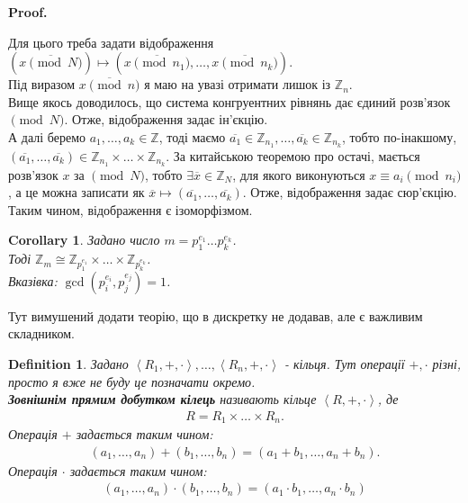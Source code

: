 \documentclass[a4paper, 14pt]{extarticle}
\makeatletter
\theoremstyle{theoremdd}
\theoremstyle{theoremdd}
\newtheorem{definition}[theorem]{Definition}
\theoremstyle{theoremdd}
\theoremstyle{theoremdd}
\theoremstyle{theoremdd}
\theoremstyle{theoremdd}
\theoremstyle{theoremdd}
\theoremstyle{theoremdd}
\newtheorem{corollary}[theorem]{Corollary}
\def\qed{$\blacksquare$}
\renewenvironment{proof}[1][Proof.\\]{\par
\pushQED{\hfill \qed}%
\normalfont \topsep6\p@\@plus6\p@\relax
\trivlist
\item\relax
{\bfseries
#1\@addpunct{.}}\hspace\labelsep\ignorespaces
}{%
\popQED\endtrivlist\@endpefalse
}
\makeatother
\begin{document}
\begin{proof}
Для цього треба задати відображення \\
$(\overline{x \pmod N}) \mapsto (\overline{x \pmod {n_1}}, \dots, \overline{x \pmod {n_k}})$.\\
Під виразом $\overline{x \pmod n}$ я маю на увазі отримати лишок із $\mathbb{Z}_n$.\\
Вище якось доводилось, що система конгруентних рівнянь дає єдиний розв'язок $\pmod N$. Отже, відображення задає ін'єкцію.\\
А далі беремо $a_1,\dots,a_k \in \mathbb{Z}$, тоді маємо $\overline{a_1} \in \mathbb{Z}_{n_1}, \dots, \overline{a_k} \in \mathbb{Z}_{n_k}$, тобто по-інакшому, $(\overline{a_1},\dots, \overline{a_k}) \in \mathbb{Z}_{n_1} \times \dots \times \mathbb{Z}_{n_k}$. За китайською теоремою про остачі, мається розв'язок $x$ за $\pmod N$, тобто $\exists \overline{x} \in \mathbb{Z}_N$, для якого виконуються $x \equiv a_i \pmod {n_i}$, а це можна записати як $\overline{x} \mapsto (\overline{a_1},\dots,\overline{a_k})$. Отже, відображення задає сюр'єкцію.\\
Таким чином, відображення є ізоморфізмом.
\end{proof}

\begin{corollary}
Задано число $m = p_1^{e_1} \dots p_k^{e_k}$.\\
Тоді $\mathbb{Z}_m \cong \mathbb{Z}_{p_1^{e_1}} \times \dots \times \mathbb{Z}_{p_k^{e_k}}$.\\
\textit{Вказівка: $\gcd(p_i^{e_i},p_j^{e_j}) = 1$.}
\end{corollary}

Тут вимушений додати теорію, що в дискретку не додавав, але є важливим складником.

\begin{definition}
Задано $\left< R_1,+,\cdot \right>, \dots, \left< R_n, +, \cdot \right>$ - кільця. Тут операції $+,\cdot$ різні, просто я вже не буду це позначати окремо.\\
\textbf{Зовнішнім прямим добутком кілець} називають кільце $\left< R,+,\cdot \right>$, де
\begin{align*}
R = R_1 \times \dots \times R_n.
\end{align*}
Операція $+$ задається таким чином:
\begin{align*}
(a_1,\dots,a_n) + (b_1,\dots,b_n) = (a_1+b_1,\dots,a_n+b_n).
\end{align*}
Операція $\cdot$ задається таким чином:
\begin{align*}
(a_1,\dots,a_n) \cdot (b_1,\dots,b_n) = (a_1 \cdot b_1, \dots, a_n \cdot b_n)
\end{align*}
\end{definition}
\end{document}
